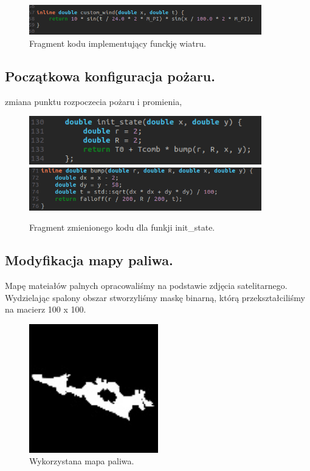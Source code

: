 \documentclass[onecolumn,12pt]{article}
\begin{document}
\begin{figure}[h]
    \centering
    \includegraphics[width=0.9\textwidth]{custom_wind.png}
    \caption{Fragment kodu implementujący funckję wiatru.}
    \label{fig:example}
\end{figure}


\subsection{Początkowa konfiguracja pożaru.}
zmiana punktu rozpoczecia pożaru i promienia, 

\begin{figure}[H]
    \centering
    \includegraphics[width=0.9\textwidth]{init_state.png}
    \includegraphics[width=0.9\textwidth]{init_state1.png}
    \caption{Fragment zmienionego kodu dla funkji init_state.}
    \label{fig:example}
\end{figure}

\subsection{Modyfikacja mapy paliwa.}
Mapę mateiałów palnych opracowaliśmy na podstawie zdjęcia satelitarnego. Wydzielając spalony obszar stworzyliśmy maskę binarną, którą przekształciliśmy na macierz 100 x 100. 

\begin{figure}[H]
    \centering
    \includegraphics[width=0.5\textwidth]{project_wildfire/IMG_0896.png}
    \caption{Wykorzystana mapa paliwa.}
    \label{fig:example}
\end{figure}
\end{document}
